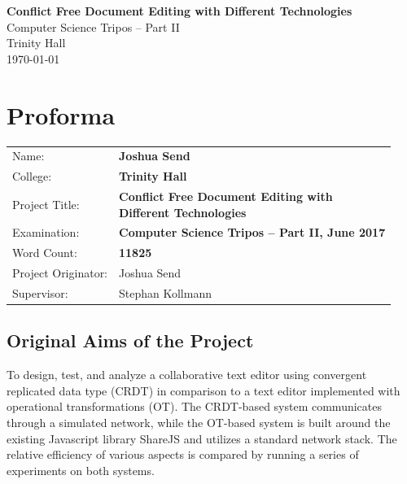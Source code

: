 \documentclass[12pt,a4paper,twoside,openright]{report}
\begin{document}



\vspace*{60mm}
\begin{center}
\Huge
\textbf{Conflict Free Document Editing with Different Technologies} \\[5mm]
Computer Science Tripos -- Part II \\[5mm]
Trinity Hall \\[5mm]
\today  %
\end{center}


\pagestyle{plain}

\chapter*{Proforma}

{\large
\begin{tabular}{ll}
Name:               & \bf Joshua Send                       \\
College:            & \bf Trinity Hall                     \\
Project Title:      & \makecell[tl]{\bf Conflict Free Document Editing with \\ \bf Different Technologies}\\
Examination:        & \bf Computer Science Tripos -- Part II, June 2017  \\
Word Count:         & \bf 11825			\\
Project Originator: & Joshua Send                    \\
Supervisor:         & Stephan Kollmann                    \\ 
\end{tabular}
}


\section*{Original Aims of the Project}

To design, test, and analyze a collaborative text editor using convergent replicated data type (CRDT) in comparison to a text editor implemented with operational transformations (OT). The CRDT-based system communicates through a simulated network, while the OT-based system is built around the existing Javascript library ShareJS and utilizes a standard network stack. The relative efficiency of various aspects is compared by running a series of experiments on both systems.
\end{document}
